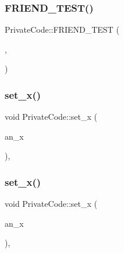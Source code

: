 \mbox{\label{class_private_code_a29b6823300f68d78691476eeeaed8a7c}} 
\subsubsection{\texorpdfstring{FRIEND\_TEST()}{FRIEND\_TEST()}\hspace{0.1cm}{\footnotesize\ttfamily [6/6]}}
{\footnotesize\ttfamily Private\+Code\+::\+F\+R\+I\+E\+N\+D\+\_\+\+T\+E\+ST (\begin{DoxyParamCaption}\item[{\mbox{\hyperlink{googletest-master_2googletest_2test_2gtest__prod__test_8cc_a89debba10c803e339ce0f9b0b34a2267}{Private\+Code\+Fixture\+Test}}}]{,  }\item[{Can\+Access\+Private\+Members}]{ }\end{DoxyParamCaption})}

\mbox{\label{class_private_code_a8d8ac6564d6425ea793f85848bb21b39}} 
\subsubsection{\texorpdfstring{set\_x()}{set\_x()}\hspace{0.1cm}{\footnotesize\ttfamily [1/3]}}
{\footnotesize\ttfamily void Private\+Code\+::set\+\_\+x (\begin{DoxyParamCaption}\item[{int}]{an\+\_\+x }\end{DoxyParamCaption})\hspace{0.3cm}{\ttfamily [inline]}, {\ttfamily [private]}}

\mbox{\label{class_private_code_a8d8ac6564d6425ea793f85848bb21b39}} 
\subsubsection{\texorpdfstring{set\_x()}{set\_x()}\hspace{0.1cm}{\footnotesize\ttfamily [2/3]}}
{\footnotesize\ttfamily void Private\+Code\+::set\+\_\+x (\begin{DoxyParamCaption}\item[{int}]{an\+\_\+x }\end{DoxyParamCaption})\hspace{0.3cm}{\ttfamily [inline]}, {\ttfamily [private]}}

